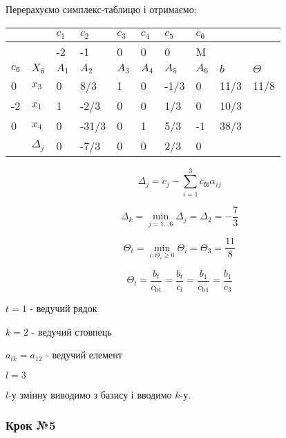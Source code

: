 \documentclass[a4paper, 12pt]{article}
\begin{document}
Перерахуємо симплекс-таблицю і отримаємо:

\begin{table}[H]
    \centering
    \begin{tabular}{|l|l|l|l|l|l|l|l|l|l|}
    \hline
         &  & $c_1$ & $c_2$ & $c_3$ & $c_4$ & $c_5$ & $c_6$ & & \\ \hline
         &  & -2 & -1 & 0 & 0 & 0 & M &  &  \\ \hline
         $c_\text{б}$ & $X_\text{б}$ & $A_1$ & $A_2$ & $A_3$ & $A_4$ & $A_5$ & $A_6$ & $b$  & $\Theta$ \\ \hline
        0 & $x_3$ & 0 & 8/3 & 1 & 0 & -1/3 & 0 & 11/3 & 11/8 \\ \hline
        -2 & $x_1$ & 1 & -2/3 & 0 & 0 & 1/3 & 0 & 10/3	 & \\ \hline
        0 & $x_4$ & 0 & -31/3 & 0 & 1 & 5/3 & -1 & 38/3 & \\ \hline
         & $\Delta_j$ & 0 & -7/3 & 0 & 0 & 2/3 & 0 &  &  \\ \hline
    \end{tabular}
\end{table}

\begin{equation*}
	\Delta_j = c_j - \sum_{i=1}^{3} c_\text{бi} \alpha_{ij}  
\end{equation*}

\begin{equation*}
	\Delta_k = \min_{j=1 \dots 6} \Delta_j = \Delta_2 = -\frac{7}{3}
\end{equation*}

\begin{equation*}
	\Theta_t = \min_{i: \Theta_i \geqslant 0} \Theta_i = \Theta_3 = \frac{11}{8}
\end{equation*}

\begin{equation*}
	\Theta_t = \frac{b_t}{c_\text{bt}} = \frac{b_t}{c_l} = \frac{b_1}{c_\text{b1}} = \frac{b_1}{c_\text{3}}
\end{equation*}

$t = 1$ - ведучий рядок

$k = 2$ - ведучий стовпець

$a_{tk} = a_{12}$ - ведучий елемент

$l = 3$

$l$-у змінну виводимо з базису і вводимо $k$-у.

\subsubsection{Крок №5}
\end{document}
